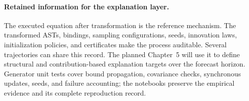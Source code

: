 \paragraph{Retained information for the explanation layer.}
The executed equation after transformation is the reference mechanism.
The transformed ASTs, bindings, sampling configurations, seeds, innovation
laws, initialization policies, and certificates make the process auditable.
Several trajectories can share this record. The planned Chapter~5 will use
it to define structural and contribution-based explanation targets over the
forecast horizon. Generator unit tests cover bound propagation, covariance checks,
synchronous updates, seeds, and failure accounting; the notebooks preserve
the empirical evidence and its complete reproduction record.
